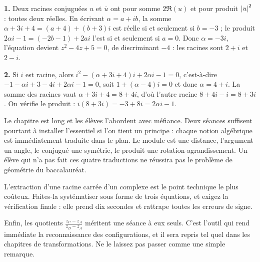 \begin{corrige}
\textbf{1.} Deux racines conjuguées $u$ et $\overline u$ ont pour somme
$2\Re(u)$ et pour produit $\left|u\right|^{2}$ : toutes deux réelles. En écrivant
$\alpha = a+ib$, la somme $\alpha+3i+4 = (a+4)+(b+3)i$ est réelle si et
seulement si $b = -3$ ; le produit $2\alpha i-1 = (-2b-1)+2ai$ l'est si et
seulement si $a = 0$. Donc $\alpha = -3i$, l'équation devient
$z^{2}-4z+5 = 0$, de discriminant $-4$ : les racines sont $2+i$ et $2-i$.

\textbf{2.} Si $i$ est racine, alors
$i^{2}-(\alpha+3i+4)i+2\alpha i-1 = 0$, c'est-à-dire
$-1-\alpha i+3-4i+2\alpha i-1 = 0$, soit $1+(\alpha-4)i = 0$ et donc
$\alpha = 4+i$. La somme des racines vaut $\alpha+3i+4 = 8+4i$, d'où l'autre
racine $8+4i-i = 8+3i$. On vérifie le produit :
$i(8+3i) = -3+8i = 2\alpha i-1$.
\end{corrige}

\begin{notepourlaclasse}
Le chapitre est long et les élèves l'abordent avec méfiance. Deux séances
suffisent pourtant à installer l'essentiel si l'on tient un principe : chaque
notion algébrique est immédiatement traduite dans le plan. Le module est une
distance, l'argument un angle, le conjugué une symétrie, le produit une
rotation-agrandissement. Un élève qui n'a pas fait ces quatre traductions ne
réussira pas le problème de géométrie du baccalauréat.

L'extraction d'une racine carrée d'un complexe est le point technique le plus
coûteux. Faites-la systématiser sous forme de trois équations, et exigez la
vérification finale : elle prend dix secondes et rattrape toutes les erreurs
de signe.

Enfin, les quotients $\frac{z_{C}-z_{A}}{z_{B}-z_{A}}$ méritent une séance à
eux seuls. C'est l'outil qui rend immédiate la reconnaissance des
configurations, et il sera repris tel quel dans les chapitres de
transformations. Ne le laissez pas passer comme une simple remarque.
\end{notepourlaclasse}

